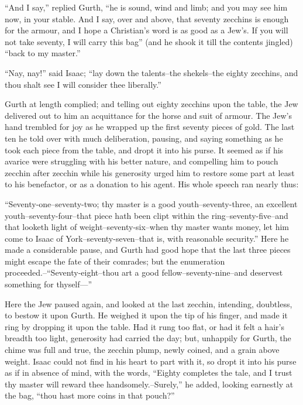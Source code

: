 ``And I say,'' replied Gurth, ``he is sound, wind and limb; and you may
see him now, in your stable. And I say, over and above, that seventy
zecchins is enough for the armour, and I hope a Christian's word is as
good as a Jew's. If you will not take seventy, I will carry this bag''
(and he shook it till the contents jingled) ``back to my master.''

``Nay, nay!'' said Isaac; ``lay down the talents--the shekels--the
eighty zecchins, and thou shalt see I will consider thee liberally.''

Gurth at length complied; and telling out eighty zecchins upon the
table, the Jew delivered out to him an acquittance for the horse and
suit of armour. The Jew's hand trembled for joy as he wrapped up the
first seventy pieces of gold. The last ten he told over with much
deliberation, pausing, and saying something as he took each piece from
the table, and dropt it into his purse. It seemed as if his avarice were
struggling with his better nature, and compelling him to pouch zecchin
after zecchin while his generosity urged him to restore some part at
least to his benefactor, or as a donation to his agent. His whole speech
ran nearly thus:

``Seventy-one--seventy-two; thy master is a good youth--seventy-three,
an excellent youth--seventy-four--that piece hath been clipt within the
ring--seventy-five--and that looketh light of weight--seventy-six--when
thy master wants money, let him come to Isaac of
York--seventy-seven--that is, with reasonable security.'' Here he made a
considerable pause, and Gurth had good hope that the last three pieces
might escape the fate of their comrades; but the enumeration
proceeded.--``Seventy-eight--thou art a good fellow--seventy-nine--and
deservest something for thyself---''

Here the Jew paused again, and looked at the last zecchin, intending,
doubtless, to bestow it upon Gurth. He weighed it upon the tip of his
finger, and made it ring by dropping it upon the table. Had it rung too
flat, or had it felt a hair's breadth too light, generosity had carried
the day; but, unhappily for Gurth, the chime was full and true, the
zecchin plump, newly coined, and a grain above weight. Isaac could not
find in his heart to part with it, so dropt it into his purse as if in
absence of mind, with the words, ``Eighty completes the tale, and I
trust thy master will reward thee handsomely.--Surely,'' he added,
looking earnestly at the bag, ``thou hast more coins in that pouch?''

